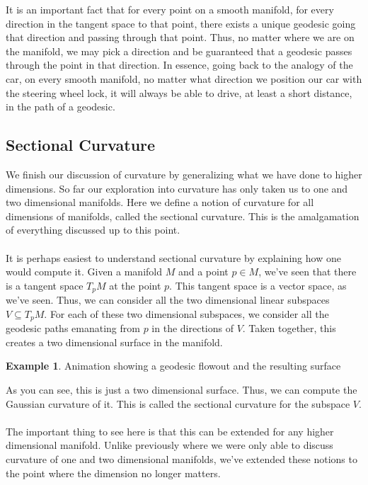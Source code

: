 \documentclass[]{article}
\newcommand\<{\ensuremath{\left\langle}}
\renewcommand\>{\ensuremath{\right\rangle}}
\theoremstyle{definition}
\theoremstyle{definition}
\newtheorem{example}{Example}[section]
\begin{document}
	It is an important fact that for every point on a smooth manifold, for every direction in the tangent space to that point, there exists a unique geodesic going that direction and passing through that point. Thus, no matter where we are on the manifold, we may pick a direction and be guaranteed that a geodesic passes through the point in that direction. In essence, going back to the analogy of the car, on every smooth manifold, no matter what direction we position our car with the steering wheel lock, it will always be able to drive, at least a short distance, in the path of a geodesic.
	
	\subsection*{Sectional Curvature}
	We finish our discussion of curvature by generalizing what we have done to higher dimensions. So far our exploration into curvature has only taken us to one and two dimensional manifolds. Here we define a notion of curvature for all dimensions of manifolds, called the sectional curvature. This is the amalgamation of everything discussed up to this point.\\
	\\
	It is perhaps easiest to understand sectional curvature by explaining how one would compute it. Given a manifold $M$ and a point $p \in M$, we've seen that there is a tangent space $T_pM$ at the point $p$. This tangent space is a vector space, as we've seen. Thus, we can consider all the two dimensional linear subspaces $V \subseteq T_pM$. For each of these two dimensional subspaces, we consider all the geodesic paths emanating from $p$ in the directions of $V$. Taken together, this creates a two dimensional surface in the manifold.
	\begin{example}
		Animation showing a geodesic flowout and the resulting surface
	\end{example}
	As you can see, this is just a two dimensional surface. Thus, we can compute the Gaussian curvature of it. This is called the sectional curvature for the subspace $V$.\\
	\\
	The important thing to see here is that this can be extended for any higher dimensional manifold. Unlike previously where we were only able to discuss curvature of one and two dimensional manifolds, we've extended these notions to the point where the dimension no longer matters.
\end{document}
